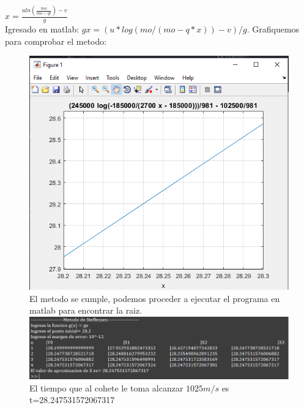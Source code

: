 \documentclass{article}
\theoremstyle{mytheoremstyle}
\theoremstyle{mytheoremstyle}
\theoremstyle{myproblemstyle}
\begin{document}
$x=\frac{uln(\frac{mo}{mo-qt})-v}{g}$
\\Igresado en matlab: $gx=(u*log(mo/(mo-q*x))-v)/g$. Grafiquemos para comprobar el metodo:
\begin{figure}[ht]
    \includegraphics[scale=0.7]{img/stf28_6.png}{\\El metodo se cumple, podemos proceder a ejecutar el programa en matlab para encontrar la raiz.}
    \includegraphics[scale=0.6]{img/stf28_7.png}{\\El tiempo que al cohete le toma alcanzar $1025m/s$ es t=28.247531572067317}
\end{figure}
\end{document}
